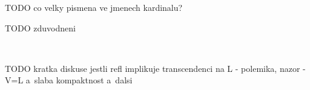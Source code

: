 TODO co velky pismena ve jmenech kardinalu?

{\color{red}
\begin{comment}

TODO Plagiat -- prepsat a~vysvetlit
\begin{Fact}
The reflection -- constructed as explained in the previous paragraph (!!! preformulovat !!!) -- with second-order parameters for higher-order formulas (even of transfinite type) does not yield transcendence over $L$.
\end{Fact}

\end{comment}
}

TODO zduvodneni

\

TODO kratka diskuse jestli refl implikuje transcendenci na L - polemika, nazor - V=L a~slaba kompaktnost a~dalsi

\
